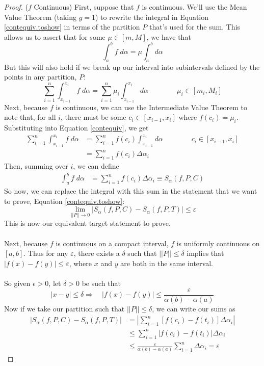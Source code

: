 \documentclass[12pt]{article}
\theoremstyle{plain}
\theoremstyle{definition}
\theoremstyle{remark}
\begin{document}
\begin{proof}($f$ Continuous)
First, suppose that $f$ is continuous. We'll use the Mean Value Theorem (taking $g=1$) to rewrite the integral in Equation \ref{contequiv.toshow} in terms of the partition $P$ that's used for the sum. This allows us to assert that for some $\mu \in [m,M]$, we have that
    \[ \int^b_a f \; d\alpha = \mu \int^b_a d\alpha \]
But this will also hold if we break up our interval into subintervals defined by the points in any partition, $P$:
\begin{equation}
    \label{contequiv}
    \sum^n_{i=1} \int^{x_i}_{x_{i-1}} f \; d\alpha 
        = \sum^n_{i=1} \mu_i \int^{x_i}_{x_{i-1}} d\alpha 
        \qquad\qquad \mu_i \in [m_i, M_i] 
\end{equation}
Next, because $f$ is continuous, we can use the Intermediate Value Theorem to note that, for all $i$, there must be some $c_i \in [x_{i-1}, x_i]$ where $f(c_i) = \mu_i$. Substituting into Equation \ref{contequiv}, we get
\begin{align*}
    \sum^n_{i=1} \int^{x_i}_{x_{i-1}} f \; d\alpha 
        &= \sum^n_{i=1} f(c_i) \int^{x_i}_{x_{i-1}} d\alpha 
        \qquad\qquad c_i \in [x_{i-1}, x_{i}] \\
        &= \sum^n_{i=1} f(c_i) \Delta\alpha_i
\end{align*}
Then, summing over $i$, we can define 
\begin{align*}
    \int^{b}_{a} f \; d\alpha 
        &= \sum^n_{i=1} f(c_i) \Delta\alpha_i
        \equiv S_\alpha(f,P,C)
\end{align*}
So now, we can replace the integral with this sum in the statement that we want to prove, Equation \ref{contequiv.toshow}:
\begin{equation}
    \label{contequiv.toshow2}
    \lim_{||P||\rightarrow 0}
    \left\lvert  S_\alpha(f,P,C)- S_\alpha(f,P,T) \right\rvert
        \leq \varepsilon
\end{equation}
This is now our equivalent target statement to prove.
\\
\\
Next, because $f$ is continuous on a compact interval, $f$ is uniformly continuous on $[a,b]$.  Thus for any $\varepsilon$, there exists a $\delta$ such that $||P||\leq\delta$ implies that $|f(x) - f(y)| \leq \varepsilon$, where $x$ and $y$ are both in the same interval.  
\\
\\
So given $\epsilon>0$, let $\delta>0$ be such that 
    \[ |x-y|\leq \delta \Rightarrow \quad |f(x)-f(y)| \leq 
        \frac{\varepsilon}{\alpha(b)-\alpha(a)} \]
Now if we take our partition such that $||P||\leq\delta$, we can write our sums as
\begin{align*}
    \left\lvert  S_\alpha(f,P,C)- S_\alpha(f,P,T) \right\rvert
    &= \left\lvert  \sum^n_{i=1} \left[f(c_i) - f(t_i) \right]
    \Delta\alpha_i\right\rvert  \\
    &\leq \sum^n_{i=1} \left\lvert  f(c_i) - f(t_i) \right\rvert
    \Delta\alpha_i  \\
    &\leq \frac{\varepsilon}{\alpha(b)-\alpha(a)}
        \sum^n_{i=1} \Delta\alpha_i =  \varepsilon 
\end{align*}
\end{proof}
\end{document}
